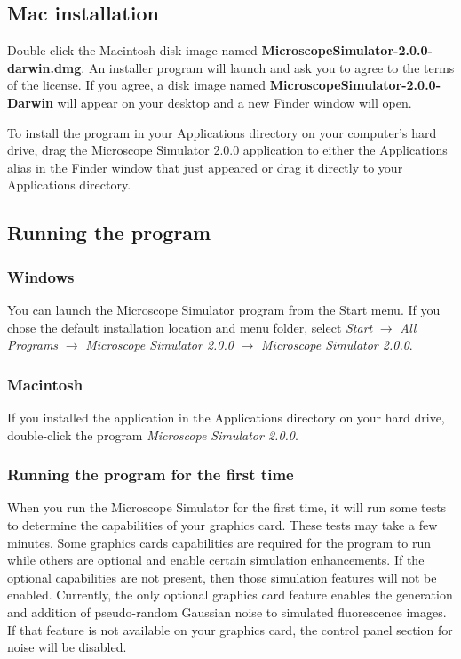 \documentclass[11pt,titlepage,twoside]{article}
\begin{document}
\subsection{Mac installation}

Double-click the Macintosh disk image named \textbf{MicroscopeSimulator-2.0.0-darwin.dmg}. An installer program will launch and ask you to agree to the terms of the license. If you agree, a disk image named \textbf{MicroscopeSimulator-2.0.0-Darwin} will appear on your desktop and a new Finder window will open.

To install the program in your Applications directory on your computer's hard drive, drag the Microscope Simulator 2.0.0 application to either the Applications alias in the Finder window that just appeared or drag it directly to your Applications directory.

\subsection{Running the program}

\subsubsection{Windows}

You can launch the Microscope Simulator program from the Start menu. If you chose the default installation location and menu folder, select \emph{Start} $\rightarrow$ \emph{All Programs} $\rightarrow$ \emph{Microscope Simulator 2.0.0} $\rightarrow$ \emph{Microscope Simulator 2.0.0}.

\subsubsection{Macintosh}

If you installed the application in the Applications directory on your hard drive, double-click the program \emph{Microscope Simulator 2.0.0}.

\subsubsection{Running the program for the first time}

When you run the Microscope Simulator for the first time, it will run some tests to determine the capabilities of your graphics card. These tests may take a few minutes. Some graphics cards capabilities are required for the program to run while others are optional and enable certain simulation enhancements. If the optional capabilities are not present, then those simulation features will not be enabled. Currently, the only optional graphics card feature enables the generation and addition of pseudo-random Gaussian noise to simulated fluorescence images. If that feature is not available on your graphics card, the control panel section for noise will be disabled.
\end{document}
